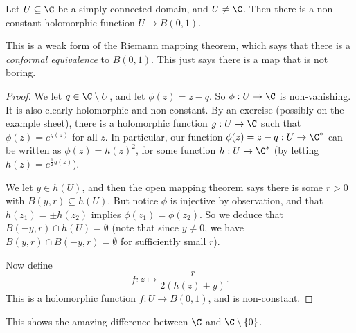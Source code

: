 \documentclass[a4paper]{article}
\begin{document}
\begin{cor}
  Let $U\subseteq \C$ be a simply connected domain, and $U \not= \C$. Then there is a non-constant holomorphic function $U \to B(0, 1)$.
\end{cor}
This is a weak form of the Riemann mapping theorem, which says that there is a \emph{conformal equivalence} to $B(0, 1)$. This just says there is a map that is not boring.

\begin{proof}
  We let $q \in \C \setminus U$, and let $\phi(z) = z - q$. So $\phi: U \to \C$ is non-vanishing. It is also clearly holomorphic and non-constant. By an exercise (possibly on the example sheet), there is a holomorphic function $g: U \to \C$ such that $\phi(z) = e^{g(z)}$ for all $z$. In particular, our function $\phi(z) = z - q: U \to \C^*$ can be written as $\phi(z) = h(z)^2$, for some function $h: U \to \C^*$ (by letting $h(z) = e^{\frac{1}{2}g(z)}$).

  We let $y \in h(U)$, and then the open mapping theorem says there is some $r > 0$ with $B(y, r) \subseteq h(U)$. But notice $\phi$ is injective by observation, and that $h(z_1) = \pm h(z_2)$ implies $\phi(z_1) = \phi(z_2)$. So we deduce that $B(-y, r) \cap h(U) = \emptyset$ (note that since $y \not= 0$, we have $B(y, r) \cap B(-y, r) = \emptyset$ for sufficiently small $r$).

  Now define
  \[
    f: z \mapsto \frac{r}{2(h(z) + y)}.
  \]
  This is a holomorphic function $f: U \to B(0, 1)$, and is non-constant.
\end{proof}
This shows the amazing difference between $\C$ and $\C \setminus \{0\}$.
\end{document}
